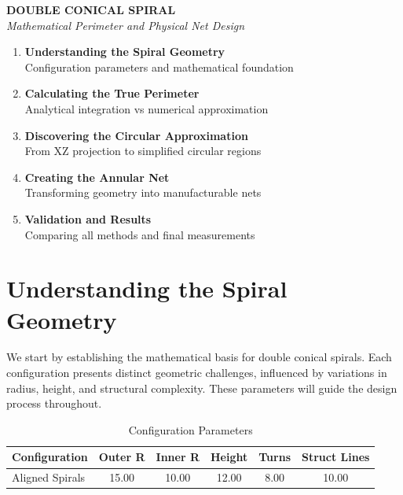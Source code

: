\documentclass{article}%
\begin{document}
%
\normalsize%
\begin{center}%
\vspace*{2cm}%
{\Huge\bfseries\color{titlecolor} DOUBLE CONICAL SPIRAL}%
\\[0.5cm]%
{\Large\itshape\color{headercolor} Mathematical Perimeter and Physical Net Design}%
\\[2cm]%
\begin{chapterbox}%
\begin{enumerate}[label=Section \arabic*:,leftmargin=2cm]%
\item%
\textbf{Understanding the Spiral Geometry} \\ Configuration parameters and mathematical foundation%
\item%
\textbf{Calculating the True Perimeter} \\ Analytical integration vs numerical approximation%
\item%
\textbf{Discovering the Circular Approximation} \\ From XZ projection to simplified circular regions%
\item%
\textbf{Creating the Annular Net} \\ Transforming geometry into manufacturable nets%
\item%
\textbf{Validation and Results} \\ Comparing all methods and final measurements%
\end{enumerate}%
\end{chapterbox}%
\vfill%
\end{center}%
\newpage%
\section{Understanding the Spiral Geometry}%
\label{sec:UnderstandingtheSpiralGeometry}%
\begin{storybox}[Introduction]%
We start by establishing the mathematical basis for double conical spirals.\newline%
            Each configuration presents distinct geometric challenges, influenced by variations in radius, height, and structural complexity.\newline%
            These parameters will guide the design process throughout.%
\end{storybox}%
\vspace{1cm}%


\begin{table}[h!]%
\caption{Configuration Parameters}%
\begin{center}%
\begin{tabular}{@{}|l|c|c|c|c|c|@{}}%
\toprule%
\midrule%
\textbf{Configuration}&\textbf{Outer R}&\textbf{Inner R}&\textbf{Height}&\textbf{Turns}&\textbf{Struct Lines}\\%
\midrule%
Aligned Spirals&15.00&10.00&12.00&8.00&10.00\\%
\midrule\bottomrule%
%
\end{tabular}%
\end{center}%
\end{table}
\end{document}
